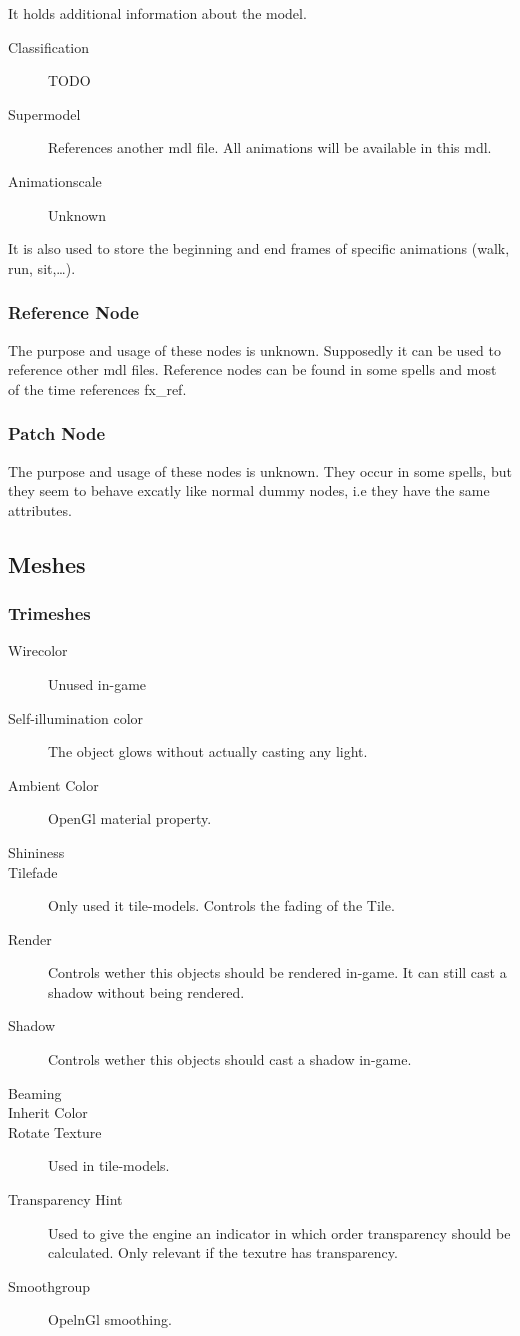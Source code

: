 It holds additional information about the model.
\begin{description}
    \item[Classification] TODO
    \item[Supermodel] References another mdl file. All animations will be available in this mdl.
    \item[Animationscale] Unknown
\end{description}
It is also used to store the beginning and end frames of specific animations
(walk, run, sit,\ldots).

\subsubsection{Reference Node}
The purpose and usage of these nodes is unknown. Supposedly it can be used to
reference other mdl files. Reference nodes can be found in some spells and
most of the time references fx\_ref.

\subsubsection{Patch Node}
The purpose and usage of these nodes is unknown. They occur in some spells, but
they seem to behave excatly like normal dummy nodes, i.e they have the same
attributes.

\subsection{Meshes}

\subsubsection{Trimeshes}

\begin{description}
    \item[Wirecolor] Unused in-game
    \item[Self-illumination color] The object glows without actually casting any light.
    \item[Ambient Color] OpenGl material property.
    \item[Shininess]
    \item[Tilefade] Only used it tile-models. Controls the fading of the Tile.
    \item[Render] Controls wether this objects should be rendered in-game. It can still cast a shadow without being rendered.
    \item[Shadow] Controls wether this objects should cast a shadow in-game.
    \item[Beaming]
    \item[Inherit Color]
    \item[Rotate Texture] Used in tile-models.
    \item[Transparency Hint] Used to give the engine an indicator in which order transparency should be calculated. Only relevant if the texutre has transparency.
    \item[Smoothgroup] OpelnGl smoothing.
\end{description}

